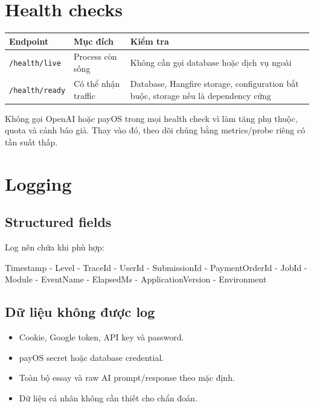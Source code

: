 \documentclass[11pt,a4paper]{article}
\newcommand{\code}[1]{\texttt{#1}}
\begin{document}
\section{Health checks}

\begin{longtable}{L{0.22\textwidth}L{0.30\textwidth}L{0.40\textwidth}}
\toprule
\textbf{Endpoint} & \textbf{Mục đích} & \textbf{Kiểm tra} \\
\midrule
\code{/health/live} & Process còn sống & Không cần gọi database hoặc dịch vụ ngoài \\
\code{/health/ready} & Có thể nhận traffic & Database, Hangfire storage, configuration bắt buộc, storage nếu là dependency cứng \\
\bottomrule
\end{longtable}

Không gọi OpenAI hoặc payOS trong mọi health check vì làm tăng phụ thuộc, quota và cảnh báo giả. Thay vào đó, theo dõi chúng bằng metrics/probe riêng có tần suất thấp.

\section{Logging}

\subsection{Structured fields}

Log nên chứa khi phù hợp:

\begin{flowbox}
Timestamp - Level - TraceId - UserId - SubmissionId - PaymentOrderId - JobId - Module - EventName - ElapsedMs - ApplicationVersion - Environment
\end{flowbox}

\subsection{Dữ liệu không được log}

\begin{itemize}
  \item Cookie, Google token, API key và password.
  \item payOS secret hoặc database credential.
  \item Toàn bộ essay và raw AI prompt/response theo mặc định.
  \item Dữ liệu cá nhân không cần thiết cho chẩn đoán.
\end{itemize}
\end{document}
